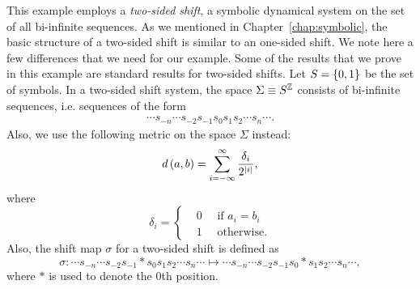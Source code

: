 \documentclass[10pt,twoside,draft]{book}
\begin{document}
\begin{example}
  \citep{blanchard}
  This example employs a \textit{two-sided shift}, a symbolic dynamical system on the set of all bi-infinite sequences.
  As we mentioned in Chapter~\ref{chap:symbolic}, the basic structure of a two-sided shift is similar to an one-sided shift.
  We note here a few differences that we need for our example.
  Some of the results that we prove in this example are standard results for two-sided shifts.
  Let $S = \left \{ 0,1 \right \}$ be the set of symbols.
  In a two-sided shift system, the space $\Sigma \equiv S^{\mathbb{Z}}$ consists of bi-infinite sequences, i.e. sequences of the form
  \begin{align*}
    \cdots s_{-n} \cdots s_{-2} s_{-1} s_0 s_1 s_2 \cdots s_n \cdots.
  \end{align*}
  Also, we use the following metric on the space $\Sigma$ instead:
  \begin{equation*}
    d\left( a,b \right) = \sum\limits_{i = -\infty}^{\infty} \frac{\delta_i}{2^{\left | i \right |}},
  \end{equation*}
  where
  \begin{equation*}
    \delta_i = 
    \begin{cases}
      &0 \quad \mbox{ if } a_i = b_i  \\
      &1 \quad \mbox{ otherwise.}
    \end{cases}
  \end{equation*}
  Also, the shift map $\sigma$ for a two-sided shift is defined as
  \begin{equation*}
    \sigma: 
    \cdots s_{-n} \cdots s_{-2} s_{-1} * s_0 s_1 s_2 \cdots s_n \cdots
    \mapsto
    \cdots s_{-n} \cdots s_{-2} s_{-1} s_0 * s_1 s_2 \cdots s_n \cdots,
  \end{equation*}
  where $*$ is used to denote the 0th position.


\end{example}
\end{document}
